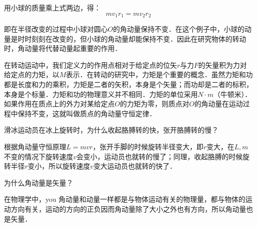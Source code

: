 用小球的质量乘上式两边，得：
\begin{equation}
mv_1r_1=mv_2r_2
\end{equation}

即在半径改变的过程中小球对圆心$O$的角动量保持不变．在这个例子中，小球的动量是时时刻刻在改变的，但小球的角动量却能保持不变．因此在研究物体的转动时，角动量将代替动量起重要的作用．

在转动运动中，我们定义力的作用点相对于给定点的位矢$r$与力$F$的矢量积为力对给定点的力矩，以$M$表示．在转动的研究中，力矩是个重要的概念．虽然力矩和功都是长度和力的乘积，力矩是二者的矢积，本身是个矢量；而功却是二者的标积，本身是个标量．力矩和功的物理意义并不相同．力矩的单位采用$N\cdot m$（牛顿米）．如果作用在质点上的外力对某给定点$O$的力矩为零，则质点对$O$的角动量在运动过程中保持不变，这就叫做质点的角动量守恒定律．

\begin{example}{}
滑冰运动员在冰上旋转时，为什么收起胳膊转的快，张开胳膊转的慢？

根据角动量守恒原理$L=mvr$，张开手脚的时候旋转半径变大，即$r$变大，在$L,m$不变的情况下旋转速度$v$会变小，运动员也就转的慢了；同理，收起胳膊的时候旋转半径$r$变小，所以旋转速度$v$变大运动员也就转的快了．
\end{example}
\begin{example}{}
为什么角动量是矢量？

在物理学中，you
角动量和动量一样都是与物体运动有关的物理量，都与物体的运动方向有关，运动的方向的正负因而角动量除了大小之外也有方向，所以角动量也是矢量．
\end{example}


